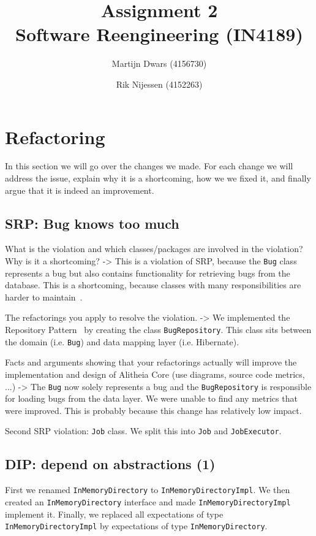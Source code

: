 \documentclass{article}
\author{Martijn Dwars (4156730) \and Rik Nijessen (4152263)}
\title{Assignment 2 \\ Software Reengineering (IN4189)}
\begin{document}
\maketitle

\section{Refactoring}
In this section we will go over the changes we made. For each change we will address the issue, explain why it is a shortcoming, how we we fixed it, and finally argue that it is indeed an improvement.

\subsection{SRP: Bug knows too much}
What is the violation and which classes/packages are involved in the violation? Why is it a shortcoming?
 -> This is a violation of SRP, because the \verb|Bug| class represents a bug but also contains functionality for retrieving bugs from the database. This is a shortcoming, because classes with many responsibilities are harder to maintain~\cite{martin2003agile}.

The refactorings you apply to resolve the violation.
 -> We implemented the Repository Pattern~\cite{repository} by creating the class \verb|BugRepository|. This class sits between the domain (i.e. \verb|Bug|) and data mapping layer (i.e. Hibernate).

Facts and arguments showing that your refactorings actually will improve the implementation and design of Alitheia Core (use diagrams, source code metrics, ...)
 -> The \verb|Bug| now solely represents a bug and the \verb|BugRepository| is responsible for loading bugs from the data layer. We were unable to find any metrics that were improved. This is probably because this change has relatively low impact.

Second SRP violation: \verb|Job| class. We split this into \verb|Job| and \verb|JobExecutor|.

\subsection{DIP: depend on abstractions (1)}
First we renamed \verb|InMemoryDirectory| to \verb|InMemoryDirectoryImpl|. We then created an \texttt{InMemoryDirectory} interface and made \verb|InMemoryDirectoryImpl| implement it. Finally, we replaced all expectations of type \verb|InMemoryDirectoryImpl| by expectations of type \verb|InMemoryDirectory|.
\end{document}
